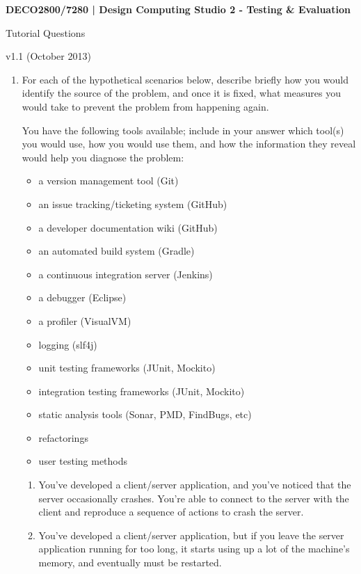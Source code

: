 \documentclass[a4paper,11pt]{article}
\begin{document}
\pagestyle{myheadings}

\begin{center}
\bf
DECO2800/7280 | Design Computing Studio 2 - Testing \& Evaluation

Tutorial Questions

v1.1 (October 2013)
\end{center}

\begin{enumerate}
\item
For each of the hypothetical scenarios below, describe briefly how you would
identify the source of the problem, and once it is fixed, what measures you
would take to prevent the problem from happening again.

You have the following tools available; include in your
answer which tool(s) you would use, how you would use them, and how the
information they reveal would help you diagnose the problem:
\begin{itemize}
\item
a version management tool (Git)
\item
an issue tracking/ticketing system (GitHub)
\item
a developer documentation wiki (GitHub)
\item
an automated build system (Gradle)
\item
a continuous integration server (Jenkins)
\item
a debugger (Eclipse)
\item
a profiler (VisualVM)
\item
logging (slf4j)
\item
unit testing frameworks (JUnit, Mockito)
\item
integration testing frameworks (JUnit, Mockito)
\item
static analysis tools (Sonar, PMD, FindBugs, etc)
\item
refactorings
\item
user testing methods
\end{itemize}

\begin{enumerate}
\item
You've developed a client/server application, and you've noticed that the
server occasionally crashes. You're able to connect to the server with the
client and reproduce a sequence of actions to crash the server.

\item
You've developed a client/server application, but if you leave the server
application running for too long, it starts using up a lot of the machine's
memory, and eventually must be restarted.


\end{enumerate}
\end{enumerate}
\end{document}
